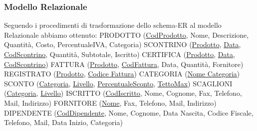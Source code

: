 \subsubsection{Modello Relazionale}

Seguendo i procedimenti di trasformazione dello schema-ER al modello Relazionale abbiamo ottenuto: \newline
PRODOTTO (\underline{CodProdotto}, Nome, Descrizione, Quantit\`a, Costo, PercentualeIVA, Categoria) \newline
SCONTRINO (\underline{Prodotto}, \underline{Data}, \underline{CodScontrino}, Quantit\`a, Subtotale, Iscritto) \newline
CERTIFICA (\underline{Prodotto}, \underline{Data}, \underline{CodScontrino}) \newline
FATTURA (\underline{Prodotto}, \underline{CodFattura}, Data, Quantit\`a, Fornitore) \newline
REGISTRATO (\underline{Prodotto}, \underline{Codice Fattura}) \newline
CATEGORIA (\underline{Nome Categoria}) \newline
SCONTO (\underline{Categoria}, \underline{Livello}, \underline{PercentualeSconto}, \underline{TettoMax}) \newline
SCAGLIONI (\underline{Categoria}, \underline{Livello}) \newline
ISCRITTO (\underline{CodIscritto}, Nome, Cognome, Fax, Telefono, Mail, Indirizzo) \newline
FORNITORE (\underline{Nome}, Fax, Telefono, Mail, Indirizzo) \newline
DIPENDENTE (\underline{CodDipendente}, Nome, Cognome, Data Nascita, Codice Fiscale, Telefono, Mail, Data Inizio, Categoria) \\

